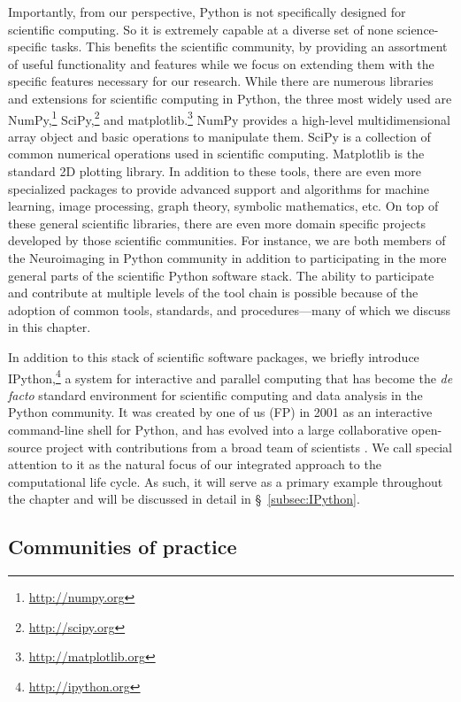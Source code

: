 \documentclass[11pt,oneside,english]{article}
\begin{document}
Importantly, from our perspective, Python is not specifically designed for
scientific computing.  So it is extremely capable at a diverse set of none
science-specific tasks. This benefits the scientific community, by providing an
assortment of useful functionality and features while we focus on extending
them with the specific features necessary for our research.  While there are
numerous libraries and extensions for scientific computing in Python, the three
most widely used are NumPy,\footnote{\url{http://numpy.org}}
SciPy,\footnote{\url{http://scipy.org}} and
matplotlib.\footnote{\url{http://matplotlib.org}}  NumPy \cite{van2011numpy}
provides a high-level multidimensional array object and basic operations to
manipulate them. SciPy is a collection of common numerical operations used in
scientific computing.  Matplotlib \cite{hunter2007matplotlib,
hunter2012matplotlib} is the standard 2D plotting library. In addition to these
tools, there are even more specialized packages to provide advanced support and
algorithms for machine learning, image processing, graph theory, symbolic
mathematics, etc. On top of these general scientific libraries, there are even
more domain specific projects developed by those scientific communities. For
instance, we are both members of the Neuroimaging in Python \cite{MIL-BRE:2007}
community in addition to participating in the more general parts of the
scientific Python software stack. The ability to participate and contribute at
multiple levels of the tool chain is possible because of the adoption of common
tools, standards, and procedures---many of which we discuss in this chapter.

In addition to this stack of scientific software packages, we briefly
introduce IPython,\footnote{\url{http://ipython.org}} a system for interactive
and parallel computing that has become the \emph{de facto} standard environment
for scientific computing and data analysis in the Python community.  It was
created by one of us (FP) in 2001 as an interactive command-line shell for
Python, and has evolved into a large collaborative open-source project with
contributions from a broad team of scientists \cite{PER-GRA:2007}. We call
special attention to it as the natural focus of our integrated approach to the
computational life cycle. As such, it will serve as a primary example
throughout the chapter and will be discussed in detail in §~\ref{subsec:IPython}.

\subsection{\label{subsec:community}Communities of practice}
\end{document}
